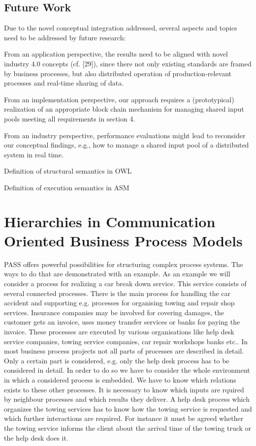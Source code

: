 \subsection{Future Work}
Due to the novel conceptual integration addressed, several aspects and topics need to be addressed by future research:
\begin{list}{-}{spacing}
\item From an application perspective, the results need to be aligned with novel industry 4.0 concepts (cf. [29]), since there not only existing standards are framed by business processes, but also distributed operation of production-relevant processes and real-time sharing of data.
\item From an implementation perspective, our approach requires a (prototypical) realization of an appropriate block chain mechanism for managing shared input pools meeting all requirements in section 4.
\item From an industry perspective, performance evaluations might lead to reconsider our conceptual findings, e.g., how to manage a shared input pool of a distributed system in real time.
\item Definition of structural semantics in OWL
\item Definition of execution semantics in ASM
\end{list}

\section{Hierarchies in Communication Oriented Business Process Models}
PASS  offers powerful possibilities for structuring complex process systems. The ways to do that are demonstrated with an example.
As an example we will consider a process for realizing a car break down service. This service consists of several connected processes. There is the main process for handling the car accident and supporting e.g. processes for organising towing and repair shop services. Insurance companies may be involved for covering damages, the customer gets an invoice, uses money transfer services or banks for paying the invoice. These processes are executed by various organisations like help desk service companies, towing service companies, car repair workshops banks etc.. In most business process projects not all parts of processes are described in detail. Only a certain part is considered, e.g. only the help desk process has to be considered in detail. In order to do so we have to consider the whole environment in which a considered process is embedded. We have to know which relations exists to these other processes. It is necessary to know which inputs are rquired by neighbour processes and which results they deliver. A help desk process which organizes the towing services has to know how the towing service is requested and which further interactions are required. For instance it must be agreed whether the towing service informs the client about the arrival time of the towing truck or the help desk does it.


